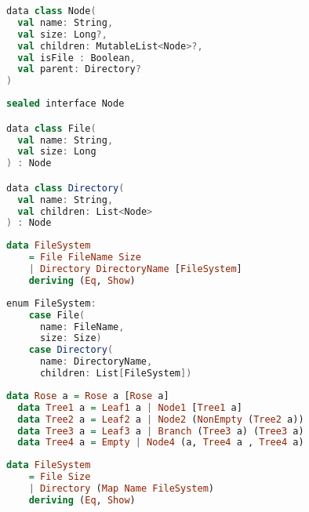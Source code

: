 \documentclass[10pt]{beamer}
\begin{document}
\begin{frame}[fragile]
\begin{lstlisting}[language=scala]
data class Node(
  val name: String,
  val size: Long?,
  val children: MutableList<Node>?,
  val isFile : Boolean, 
  val parent: Directory?
)
\end{lstlisting}
\end{frame}
\begin{frame}[fragile]
\begin{lstlisting}[language=scala]
sealed interface Node

data class File(
  val name: String,
  val size: Long
) : Node

data class Directory(
  val name: String,
  val children: List<Node>
) : Node
\end{lstlisting}
\end{frame}

\begin{frame}[fragile]
  \begin{lstlisting}[language=haskell]
  data FileSystem
    = File FileName Size
    | Directory DirectoryName [FileSystem]
    deriving (Eq, Show)
  \end{lstlisting}
\end{frame}
\begin{frame}[fragile]
  \begin{lstlisting}[language=scala]
  enum FileSystem:
    case File(
      name: FileName,
      size: Size)
    case Directory(
      name: DirectoryName, 
      children: List[FileSystem])
  \end{lstlisting}
\end{frame}
\begin{frame}[fragile]
  \begin{lstlisting}[language=haskell]
  data Rose a = Rose a [Rose a] 
  data Tree1 a = Leaf1 a | Node1 [Tree1 a] 
  data Tree2 a = Leaf2 a | Node2 (NonEmpty (Tree2 a)) 
  data Tree3 a = Leaf3 a | Branch (Tree3 a) (Tree3 a) 
  data Tree4 a = Empty | Node4 (a, Tree4 a , Tree4 a) 
  \end{lstlisting}
\end{frame}

\begin{frame}[fragile]
  \begin{lstlisting}[language=haskell]
  data FileSystem
    = File Size
    | Directory (Map Name FileSystem)
    deriving (Eq, Show)
  \end{lstlisting}
\end{frame}
\end{document}
